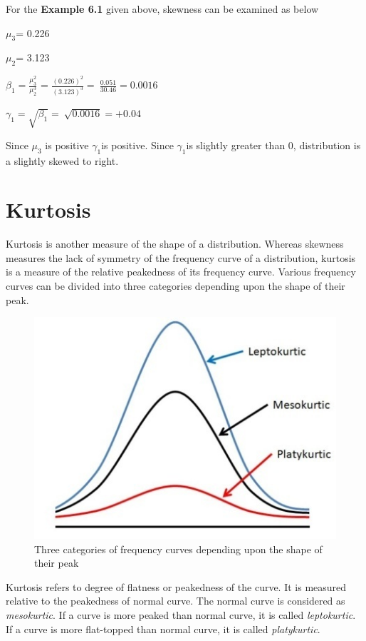 \documentclass[
]{book}
\begin{document}
For the \textbf{Example 6.1} given above, skewness can be examined as below

\(\mu_{3}\)= 0.226

\(\mu_{2}\)= 3.123

\(\beta_{1} = \frac{\mu_{3}^{2}}{\mu_{2}^{3}}\) = \(\frac{\left( 0.226 \right)^{2}}{\left( 3.123 \right)^{3}} = \ \frac{0.051}{30.46} = 0.0016\)

\(\gamma_{1} = \sqrt{\beta_{1}} = \ \sqrt{0.0016} = + 0.04\)

Since \(\mu_{3}\) is positive \(\gamma_{1}\)is positive. Since \(\gamma_{1}\)is slightly greater than 0, distribution is a slightly skewed to right.

\section{Kurtosis}\label{kurtosis}

Kurtosis is another measure of the shape of a distribution. Whereas skewness measures the lack of symmetry of the frequency curve of a distribution, kurtosis is a measure of the relative peakedness of its frequency curve. Various frequency curves can be divided into three categories depending upon the shape of their peak.

\begin{figure}

{\centering \includegraphics[width=0.5\linewidth]{images/image10_5} 

}

\caption{Three categories of frequency curves depending upon the shape of their peak}\label{fig:k1}
\end{figure}

Kurtosis refers to degree of flatness or peakedness of the curve. It is measured relative to the peakedness of normal curve. The normal curve is considered as \emph{mesokurtic}. If a curve is more peaked than normal curve, it is called \emph{leptokurtic}. If a curve is more flat-topped than normal curve, it is called \emph{platykurtic}.
\end{document}
